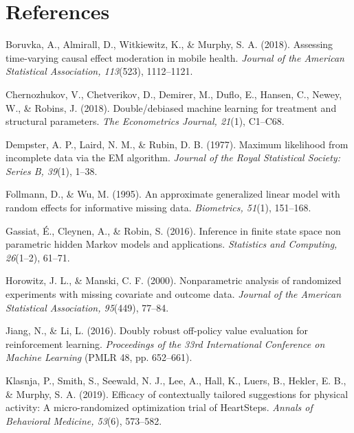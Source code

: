 \documentclass[12pt]{article}
\begin{document}
\section*{References}
\begin{list}{}{\setlength{\leftmargin}{0.5in}\setlength{\itemindent}{-0.5in}\setlength{\itemsep}{3pt}}

\item Boruvka, A., Almirall, D., Witkiewitz, K., \& Murphy, S. A. (2018). Assessing time-varying causal effect moderation in mobile health. \textit{Journal of the American Statistical Association, 113}(523), 1112--1121.

\item Chernozhukov, V., Chetverikov, D., Demirer, M., Duflo, E., Hansen, C., Newey, W., \& Robins, J. (2018). Double/debiased machine learning for treatment and structural parameters. \textit{The Econometrics Journal, 21}(1), C1--C68.

\item Dempster, A. P., Laird, N. M., \& Rubin, D. B. (1977). Maximum likelihood from incomplete data via the EM algorithm. \textit{Journal of the Royal Statistical Society: Series B, 39}(1), 1--38.

\item Follmann, D., \& Wu, M. (1995). An approximate generalized linear model with random effects for informative missing data. \textit{Biometrics, 51}(1), 151--168.

\item Gassiat, É., Cleynen, A., \& Robin, S. (2016). Inference in finite state space non parametric hidden Markov models and applications. \textit{Statistics and Computing, 26}(1--2), 61--71.

\item Horowitz, J. L., \& Manski, C. F. (2000). Nonparametric analysis of randomized experiments with missing covariate and outcome data. \textit{Journal of the American Statistical Association, 95}(449), 77--84.

\item Jiang, N., \& Li, L. (2016). Doubly robust off-policy value evaluation for reinforcement learning. \textit{Proceedings of the 33rd International Conference on Machine Learning} (PMLR 48, pp. 652--661).

\item Klasnja, P., Smith, S., Seewald, N. J., Lee, A., Hall, K., Luers, B., Hekler, E. B., \& Murphy, S. A. (2019). Efficacy of contextually tailored suggestions for physical activity: A micro-randomized optimization trial of HeartSteps. \textit{Annals of Behavioral Medicine, 53}(6), 573--582.


\end{list}
\end{document}
